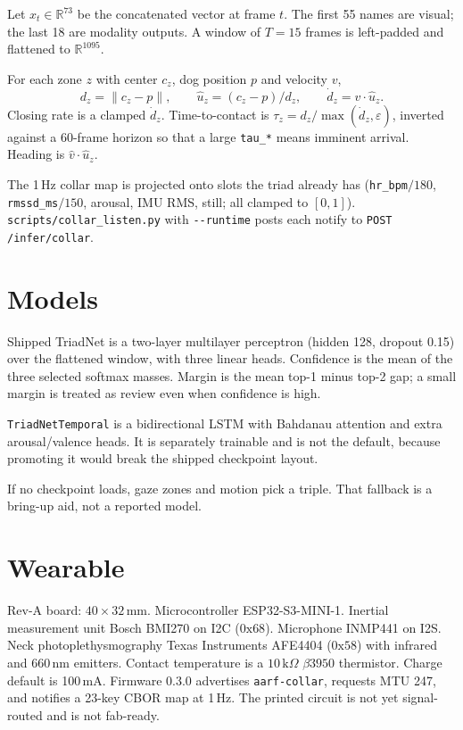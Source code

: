 \documentclass[11pt]{article}
\begin{document}
Let $x_t \in \mathbb{R}^{73}$ be the concatenated vector at frame $t$.
The first 55 names are visual; the last 18 are modality outputs.
A window of $T=15$ frames is left-padded and flattened to $\mathbb{R}^{1095}$.

For each zone $z$ with center $c_z$, dog position $p$ and velocity $v$,
\begin{equation}
  d_z = \|c_z - p\|,\qquad
  \hat{u}_z = (c_z - p)/d_z,\qquad
  \dot{d}_z = v \cdot \hat{u}_z.
\end{equation}
Closing rate is a clamped $\dot{d}_z$.
Time-to-contact is $\tau_z = d_z / \max(\dot{d}_z, \varepsilon)$, inverted against a 60-frame horizon
so that a large \texttt{tau\_*} means imminent arrival.
Heading is $\hat{v} \cdot \hat{u}_z$.

The 1\,Hz collar map is projected onto slots the triad already has
(\texttt{hr\_bpm}$/180$, \texttt{rmssd\_ms}$/150$, arousal, IMU RMS, still;
all clamped to $[0,1]$).
\texttt{scripts/collar\_listen.py} with \texttt{-{}-runtime} posts each notify
to \texttt{POST /infer/collar}.

\section{Models}

Shipped TriadNet is a two-layer multilayer perceptron (hidden 128, dropout 0.15) over the flattened
window, with three linear heads.
Confidence is the mean of the three selected softmax masses.
Margin is the mean top-1 minus top-2 gap; a small margin is treated as review even when confidence is high.

\texttt{TriadNetTemporal} is a bidirectional LSTM with Bahdanau attention and extra arousal/valence
heads.
It is separately trainable and is not the default, because promoting it would break the shipped
checkpoint layout.

If no checkpoint loads, gaze zones and motion pick a triple.
That fallback is a bring-up aid, not a reported model.

\section{Wearable}

Rev-A board: $40\times 32$\,mm.
Microcontroller ESP32-S3-MINI-1.
Inertial measurement unit Bosch BMI270 on I2C ($0\mathrm{x}68$).
Microphone INMP441 on I2S.
Neck photoplethysmography Texas Instruments AFE4404 ($0\mathrm{x}58$) with infrared and 660\,nm
emitters.
Contact temperature is a $10\,\mathrm{k}\Omega$ $\beta 3950$ thermistor.
Charge default is 100\,mA.
Firmware 0.3.0 advertises \texttt{aarf-collar}, requests MTU 247, and notifies a 23-key CBOR map at 1\,Hz.
The printed circuit is not yet signal-routed and is not fab-ready.
\end{document}
